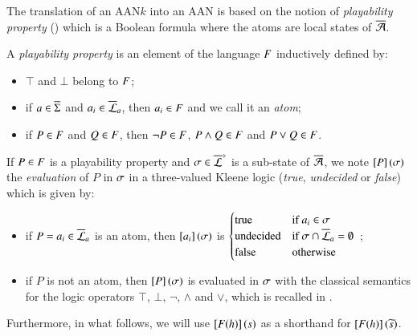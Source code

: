 The translation of an AAN$k$ into an AAN
is based on the notion of \emph{playability property} ()
which is a Boolean formula where the atoms are local states of $\overline{\mathcal{A}}$.

\begin{definition}
  \label{def:pp}
  A \emph{playability property} is an element of the language $F$ inductively defined by:
  \begin{itemize}
    \item $\top$ and $\bot$ belong to $F$;
    \item if $a \in \overline{\Sigma}$ and $a_i \in \overline{\mathcal{L}}_a$, then $a_i \in F$ and we call it an \emph{atom};
    \item if $P \in F$ and $Q \in F$, then $\neg P \in F$, $P \wedge Q \in F$ and $P \vee Q \in F$.
  \end{itemize}
  If $P \in F$ is a playability property and $\sigma \in \overline{\mathcal{L}}^{\diamond}$ is a sub-state of $\overline{\mathcal{A}}$,
  we note $\left[P\right](\sigma)$ the \emph{evaluation} of $P$ in $\sigma$
  in a three-valued Kleene logic (\emph{true}, \emph{undecided} or \emph{false})
  which is given by:
  \begin{itemize}
    \item if $P = a_i \in \overline{\mathcal{L}}_a$ is an atom,
      then $\left[a_i\right](\sigma)$ is
    $\begin{cases}
       \text{true}      & \text{if } a_i \in \sigma \\
       \text{undecided} & \text{if } \sigma \cap \overline{\mathcal{L}}_a = \emptyset \\
       \text{false}     & \text{otherwise }
     \end{cases}$ \enspace;
    \item if $P$ is not an atom, then $\left[P\right](\sigma)$ is evaluated in $\sigma$
      with the classical semantics for the logic operators $\top$, $\bot$, $\neg$, $\wedge$ and $\vee$, which is recalled in .
  \end{itemize}
  Furthermore, in what follows, we will use $\left[F(h)\right](s)$ as a shorthand for
  $\left[F(h)\right](\widetilde{s})$.
\end{definition}

